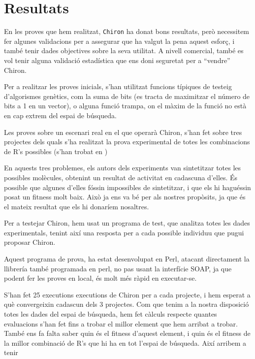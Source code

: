 \documentclass[titlepage,a4paper,12pt]{book}
\begin{document}
\section{Resultats} %
	\label{sec:Resultats}

	En les proves que hem realitzat, \texttt{Chiron} ha donat bons resultats,
	però necessitem fer algunes validacions per a assegurar que ha valgut la
	pena aquest esforç, i també tenir dades objectives sobre la seva utilitat.
	A nivell comercial, també es vol tenir alguna validació estadística que ens
	doni seguretat per a ``vendre'' Chiron.

	Per a realitzar les proves inicials, s'han utilitzat funcions típiques de
	testeig d'algorismes genètics, com la suma de bits (es tracta de maximitzar
	el número de bits a 1 en un vector), o alguna funció trampa, on el màxim de
	la funció no està en cap extrem del espai de búsqueda.

	Les proves sobre un escenari real en el que operarà Chiron, s'han fet sobre
	tres projectes dels quals s'ha realitzat la prova experimental de totes les
	combinacions de R's possibles (s'han trobat en 
	)

	En aquests tres problemes, els autors dels experiments van sintetitzar totes
	les possibles molècules, obtenint un resultat de activitat en cadascuna
	d'elles.  És possible que algunes d'elles fóssin impossibles de sintetitzar,
	i que els hi haguéssin posat un fitness molt baix.  Això ja ens va bé per
	als nostres propòsits, ja que és el mateix resultat que els hi donaríem
	nosaltres.

	Per a testejar Chiron, hem usat un programa de test, que analitza totes les
	dades experimentals, tenint així una resposta per a cada possible individuu
	que pugui proposar Chiron.

	Aquest programa de prova, ha estat desenvolupat en Perl, atacant directament
	la llibrería també programada en perl, no pas usant la interfície SOAP, ja
	que podent fer les proves en local, és molt més ràpid en executar-se.

	S'han fet 25 executions executions de Chiron per a cada projecte, i hem
	esperat a què convergeixin cadascun dels 3 projectes.  Com que tenim a la
	nostra disposició totes les dades del espai de búsqueda, hem fet càlculs
	respecte quantes evaluacions s'han fet fins a trobar el millor element que
	hem arribat a trobar.  També ens fa falta saber quin és el fitness d'aquest
	element, i quin és el fitness de la millor combinació de R's que hi ha en
	tot l'espai de búsqueda. Així arribem a tenir
\end{document}

